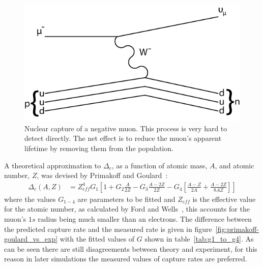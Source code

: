 \begin{figure}[htpb]
  \centering
    \includegraphics[scale=1]{images/nuclear_muon_capture.png}
  \caption{Nuclear capture of a negative muon. This process is very hard to detect directly. The net effect is to reduce the muon's apparent lifetime by removing them from the population.}
  \label{fig:images_nuclear_muon_capture}
\end{figure}

A theoretical approximation to \( \Delta_c \), as a function of atomic mass, \( A \), and atomic number, \( Z \), was devised by Primakoff and Goulard~\cite{goulard_primakoff}:
\begin{align}
  \Delta_c(A,Z)&=Z^4_{eff} G_1 \left[ 1 + G_2 \frac{A}{2Z} - G_3 \frac{A-2Z}{2Z} - G_4 \left[\frac{A-Z}{2A} + \frac{A-2Z}{8AZ} \right] \right]
  \label{eq:primakoff_and_goulard}
\end{align}
where the values \(G_{1-4}\) are parameters to be fitted and \( Z_{eff} \) is the effective value for the atomic number, as calculated by Ford and Wells~\cite{ford_and_wills_mesonic_atoms}, this accounts for the muon's \( 1s \) radius being much smaller than an electrons. The difference between the predicted capture rate and the measured rate is given in figure~\ref{fig:primakoff-goulard_vs_exp} with the fitted values of \(G\) shown in table~\ref{tab:g1_to_g4}. As can be seen there are still disagreements between theory and experiment, for this reason in later simulations the measured values of capture rates are preferred.

